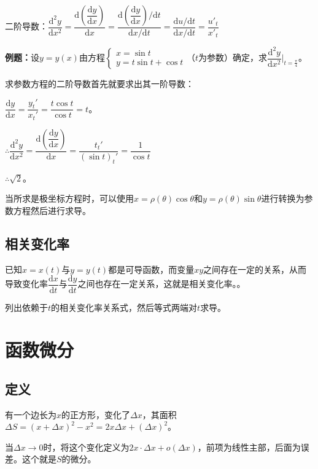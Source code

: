 \documentclass[UTF8, 12pt]{ctexart}
\begin{document}
二阶导数：$\dfrac{\textrm{d}^2y}{\textrm{d}x^2}=\dfrac{\textrm{d}\left(\dfrac{\textrm{d}y}{\textrm{d}x}\right)}{\textrm{d}x}=\dfrac{\textrm{d}\left(\dfrac{\textrm{d}y}{\textrm{d}x}\right)/\textrm{d}t}{\textrm{d}x/\textrm{d}t}=\dfrac{\textrm{d}u/\textrm{d}t}{\textrm{d}x/\textrm{d}t}=\dfrac{u'_t}{x'_t}$

\textbf{例题：}设$y=y(x)$由方程$\left\{
\begin{array}{l}
    x=\sin t \\
    y=t\sin t+\cos t
\end{array}
\right.
$（$t$为参数）确定，求$\dfrac{\textrm{d}^2y}{\textrm{d}x^2}\vert_{t=\frac{\pi}{4}}$。

求参数方程的二阶导数首先就要求出其一阶导数：\medskip

$\dfrac{\textrm{d}y}{\textrm{d}x}=\dfrac{y_t'}{x_t'}=\dfrac{t\cos t}{\cos t}=t$。\medskip

$\therefore\dfrac{\textrm{d}^2y}{\textrm{d}x^2}=\dfrac{\textrm{d}\left(\dfrac{\textrm{d}y}{\textrm{d}x}\right)}{\textrm{d}x}=\dfrac{t_t'}{(\sin t)_t'}=\dfrac{1}{\cos t}$\medskip

$\therefore \sqrt{2}$。

当所求是极坐标方程时，可以使用$x=\rho(\theta)\cos\theta$和$y=\rho(\theta)\sin\theta$进行转换为参数方程然后进行求导。

\subsection{相关变化率}

已知$x=x(t)$与$y=y(t)$都是可导函数，而变量$xy$之间存在一定的关系，从而导致变化率$\dfrac{\textrm{d}x}{\textrm{d}t}$与$\dfrac{\textrm{d}y}{\textrm{d}t}$之间也存在一定关系，这就是相关变化率。。

列出依赖于$t$的相关变化率关系式，然后等式两端对$t$求导。

\section{函数微分}

\subsection{定义}

有一个边长为$x$的正方形，变化了$\Delta x$，其面积$\Delta S=(x+\Delta x)^2-x^2=2x\Delta x+(\Delta x)^2$。

当$\Delta x\to 0$时，将这个变化定义为$2x\cdot\Delta x+o(\Delta x)$，前项为线性主部，后面为误差。这个就是$S$的微分。
\end{document}
